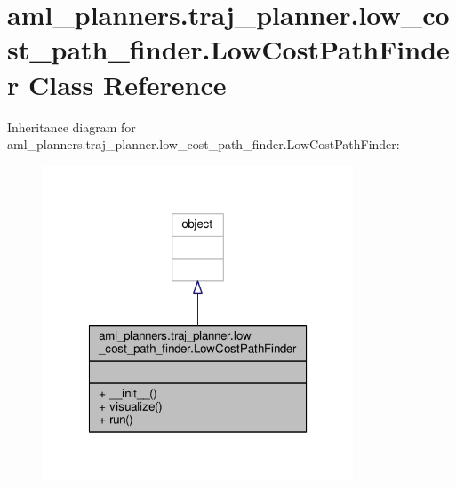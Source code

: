 \hypertarget{classaml__planners_1_1traj__planner_1_1low__cost__path__finder_1_1_low_cost_path_finder}{\section{aml\-\_\-planners.\-traj\-\_\-planner.\-low\-\_\-cost\-\_\-path\-\_\-finder.\-Low\-Cost\-Path\-Finder Class Reference}
\label{classaml__planners_1_1traj__planner_1_1low__cost__path__finder_1_1_low_cost_path_finder}
}


Inheritance diagram for aml\-\_\-planners.\-traj\-\_\-planner.\-low\-\_\-cost\-\_\-path\-\_\-finder.\-Low\-Cost\-Path\-Finder\-:\nopagebreak
\begin{figure}[H]
\begin{center}
\leavevmode
\includegraphics[width=262pt]{classaml__planners_1_1traj__planner_1_1low__cost__path__finder_1_1_low_cost_path_finder__inherit__graph}
\end{center}
\end{figure}


